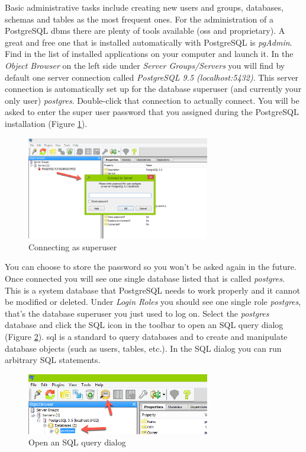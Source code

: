\documentclass[a4paper,12pt,titlepage]{article}
\begin{document}
Basic administrative tasks include creating new users and groups, databases, schemas and tables as the most frequent ones. For the administration of a PostgreSQL \gls{dbms} there are plenty of tools available (\gls{oss} and proprietary). A great and free one that is installed automatically with PostgreSQL is \textit{pgAdmin}. Find in the list of installed applications on your computer and launch it. In the \textit{Object Browser} on the left side under \textit{Server Groups/Servers} you will find by default one server connection called \textit{PostgreSQL 9.5 (localhost:5432)}. This server connection is automatically set up for the database superuser (and currently your only user) \textit{postgres}. Double-click that connection to actually connect. You will be asked to enter the super user password that you assigned during the PostgreSQL installation (Figure \ref{fig:connect_to_server}).

\begin{figure}[htb]
	\centering
	\includegraphics[width=8cm]{Images/connect_to_server.png}
	\caption{Connecting as superuser}\label{fig:connect_to_server}
\end{figure}

You can choose to store the password so you won't be asked again in the future. Once connected you will see one single database listed that is called \textit{postgres}. This is a system database that PostgreSQL needs to work properly and it cannot be modified or deleted. Under \textit{Login Roles} you should see one single role \textit{postgres}, that's the database superuser you just used to log on. Select the \textit{postgres} database and click the SQL icon in the toolbar to open an SQL query dialog (Figure \ref{fig:sql_icon}). \gls{sql} is a standard to query databases and to create and manipulate database objects (such as users, tables, etc.). In the SQL dialog you can run arbitrary SQL statements.

\begin{figure}[htb]
	\centering
	\includegraphics[width=8cm]{Images/sql_icon.png}
	\caption{Open an SQL query dialog}\label{fig:sql_icon}
\end{figure}
\end{document}
